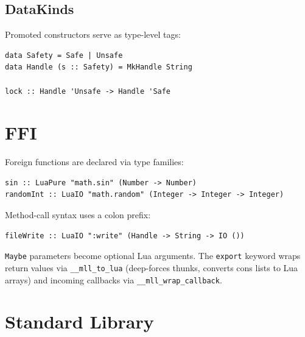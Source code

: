\documentclass[11pt,a4paper]{article}
\begin{document}
\subsection{DataKinds}

Promoted constructors serve as type-level tags:
\begin{lstlisting}[language=MLL]
data Safety = Safe | Unsafe
data Handle (s :: Safety) = MkHandle String

lock :: Handle 'Unsafe -> Handle 'Safe
\end{lstlisting}

\section{FFI}

Foreign functions are declared via type families:
\begin{lstlisting}[language=MLL]
sin :: LuaPure "math.sin" (Number -> Number)
randomInt :: LuaIO "math.random" (Integer -> Integer -> Integer)
\end{lstlisting}

Method-call syntax uses a colon prefix:
\begin{lstlisting}[language=MLL]
fileWrite :: LuaIO ":write" (Handle -> String -> IO ())
\end{lstlisting}

\texttt{Maybe} parameters become optional Lua arguments.  The \texttt{export}
keyword wraps return values via \texttt{\_\_mll\_to\_lua} (deep-forces thunks,
converts cons lists to Lua arrays) and incoming callbacks via
\texttt{\_\_mll\_wrap\_callback}.

\section{Standard Library}
\end{document}
